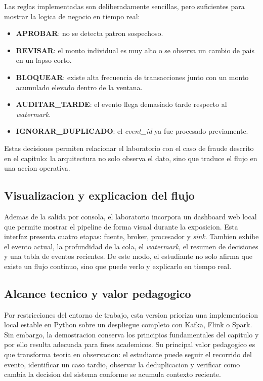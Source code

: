 \documentclass[12pt,a4paper]{article}
\begin{document}
Las reglas implementadas son deliberadamente sencillas, pero suficientes para mostrar la logica de negocio en tiempo real:

\begin{itemize}
  \item \textbf{APROBAR}: no se detecta patron sospechoso.
  \item \textbf{REVISAR}: el monto individual es muy alto o se observa un cambio de pais en un lapso corto.
  \item \textbf{BLOQUEAR}: existe alta frecuencia de transacciones junto con un monto acumulado elevado dentro de la ventana.
  \item \textbf{AUDITAR\_TARDE}: el evento llega demasiado tarde respecto al \textit{watermark}.
  \item \textbf{IGNORAR\_DUPLICADO}: el \textit{event\_id} ya fue procesado previamente.
\end{itemize}

Estas decisiones permiten relacionar el laboratorio con el caso de fraude descrito en el capitulo: la arquitectura no solo observa el dato, sino que traduce el flujo en una accion operativa.

\subsection{Visualizacion y explicacion del flujo}

Ademas de la salida por consola, el laboratorio incorpora un dashboard web local que permite mostrar el pipeline de forma visual durante la exposicion. Esta interfaz presenta cuatro etapas: fuente, broker, procesador y \textit{sink}. Tambien exhibe el evento actual, la profundidad de la cola, el \textit{watermark}, el resumen de decisiones y una tabla de eventos recientes. De este modo, el estudiante no solo afirma que existe un flujo continuo, sino que puede verlo y explicarlo en tiempo real.

\subsection{Alcance tecnico y valor pedagogico}

Por restricciones del entorno de trabajo, esta version prioriza una implementacion local estable en Python sobre un despliegue completo con Kafka, Flink o Spark. Sin embargo, la demostracion conserva los principios fundamentales del capitulo y por ello resulta adecuada para fines academicos. Su principal valor pedagogico es que transforma teoria en observacion: el estudiante puede seguir el recorrido del evento, identificar un caso tardio, observar la deduplicacion y verificar como cambia la decision del sistema conforme se acumula contexto reciente.
\end{document}
